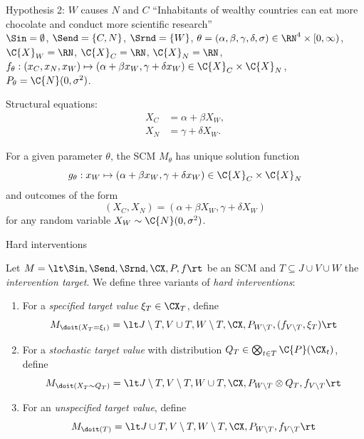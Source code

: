 \begin{frame}{Hypothesis 2: $W$ causes $N$ and $C$}
  ``Inhabitants of wealthy countries can eat more chocolate and conduct more scientific research''\\

  $\Sin = \emptyset$, $\Send = \{C,N\}$, $\Srnd = \{W\}$, $\theta = (\alpha,\beta,\gamma,\delta,\sigma) \in \RN^4 \times [0,\infty)$, $\C{X}_W = \RN$, $\C{X}_C = \RN$, $\C{X}_N = \RN$, $f_{\theta} : (x_C,x_N,x_W) \mapsto (\alpha + \beta x_W, \gamma + \delta x_W) \in \C{X}_C \times \C{X}_N$, $P_{\theta} = \C{N}(0,\sigma^2)$.

  Structural equations:
    \begin{align*}
      X_C & = \alpha + \beta X_W, \\
      X_N & = \gamma + \delta X_W.
    \end{align*}
  
  For a given parameter $\theta$, the SCM $M_{\theta}$ has unique solution function 
  $$g_\theta : x_W \mapsto (\alpha + \beta x_W, \gamma + \delta x_W) \in \C{X}_C \times \C{X}_N$$
  and outcomes of the form
  $$(X_C,X_N) = (\alpha + \beta X_W, \gamma + \delta X_W)$$ 
  for any random variable $X_W \sim \C{N}(0,\sigma^2)$.
\end{frame}

\begin{frame}{Hard interventions}
  \begin{Def}[\ref{def:scm_hard_intervention}, \ref{def:scm_hard_intervention_stochastic}, \ref{def:scm_hard_intervention_unspecified}]
  Let $M = \lt \Sin, \Send, \Srnd, \CX, P, f \rt$ be an SCM and
  $T \subseteq J \cup V \cup W$ the \emph{intervention target}. We define three variants of \emph{hard interventions}:
    \begin{enumerate}
      \item For a \emph{specified target value} $\xi_T \in \CX_T$, define
    $$M_{\doit(X_T=\xi_t)} = \lt J\setminus T, V \cup T, W \setminus T, \CX, P_{W\setminus T}, (f_{V\setminus T},\xi_T)\rt$$
  \item For a \emph{stochastic target value} with distribution $Q_T \in \bigotimes_{t\in T} \C{P}(\CX_t)$, define
    $$M_{\doit(X_T\sim Q_T)} = \lt J\setminus T, V \setminus T, W \cup T, \CX, P_{W\setminus T} \otimes Q_T, f_{V\setminus T}\rt$$
  \item For an \emph{unspecified target value}, define
    $$M_{\doit(T)} = \lt J\cup T, V\setminus T, W \setminus T, \CX, P_{W\setminus T}, f_{V\setminus T} \rt$$
    \end{enumerate}
  \end{Def}
\end{frame}

